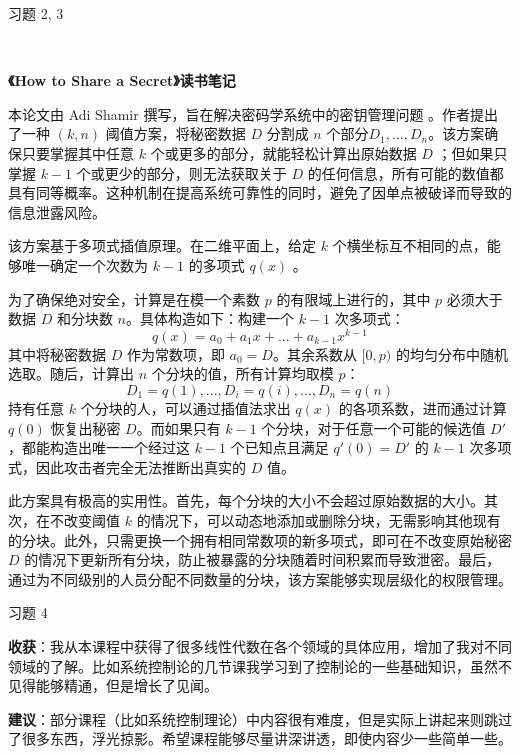 \begin{problem}
	习题 2, 3
	\begin{solution}
		\ 
		\begin{center}
			\large \textbf{《How to Share a Secret》读书笔记}
		\end{center}

		本论文由 Adi Shamir 撰写，旨在解决密码学系统中的密钥管理问题 。作者提出了一种 $(k, n)$ 阈值方案，将秘密数据 $D$ 分割成 $n$ 个部分$D_{1},...,D_{n}$。该方案确保只要掌握其中任意 $k$ 个或更多的部分，就能轻松计算出原始数据 $D$ ；但如果只掌握 $k-1$ 个或更少的部分，则无法获取关于 $D$ 的任何信息，所有可能的数值都具有同等概率。这种机制在提高系统可靠性的同时，避免了因单点被破译而导致的信息泄露风险。

		该方案基于多项式插值原理。在二维平面上，给定 $k$ 个横坐标互不相同的点，能够唯一确定一个次数为 $k-1$ 的多项式 $q(x)$ 。

		为了确保绝对安全，计算是在模一个素数 $p$ 的有限域上进行的，其中 $p$ 必须大于数据 $D$ 和分块数 $n$。具体构造如下：构建一个 $k-1$ 次多项式：
		$$
		q(x)=a_{0}+a_{1}x+...+a_{k-1}x^{k-1}
		$$
		其中将秘密数据 $D$ 作为常数项，即 $a_{0}=D$。其余系数从 $[0, p)$ 的均匀分布中随机选取。随后，计算出 $n$ 个分块的值，所有计算均取模 $p$：
		$$
		D_{1}=q(1),...,D_{i}=q(i),...,D_{n}=q(n)
		$$
		持有任意 $k$ 个分块的人，可以通过插值法求出 $q(x)$ 的各项系数，进而通过计算 $q(0)$ 恢复出秘密 $D$。而如果只有 $k-1$ 个分块，对于任意一个可能的候选值 $D'$，都能构造出唯一一个经过这 $k-1$ 个已知点且满足 $q'(0)=D'$ 的 $k-1$ 次多项式，因此攻击者完全无法推断出真实的 $D$ 值。

		此方案具有极高的实用性。首先，每个分块的大小不会超过原始数据的大小。其次，在不改变阈值 $k$ 的情况下，可以动态地添加或删除分块，无需影响其他现有的分块。此外，只需更换一个拥有相同常数项的新多项式，即可在不改变原始秘密 $D$ 的情况下更新所有分块，防止被暴露的分块随着时间积累而导致泄密。最后，通过为不同级别的人员分配不同数量的分块，该方案能够实现层级化的权限管理。
	\end{solution}
\end{problem}

\begin{problem}
	习题 4
	\begin{solution}
		\textbf{收获}：我从本课程中获得了很多线性代数在各个领域的具体应用，增加了我对不同领域的了解。比如系统控制论的几节课我学习到了控制论的一些基础知识，虽然不见得能够精通，但是增长了见闻。

		\textbf{建议}：部分课程（比如系统控制理论）中内容很有难度，但是实际上讲起来则跳过了很多东西，浮光掠影。希望课程能够尽量讲深讲透，即使内容少一些简单一些。
	\end{solution}
\end{problem}